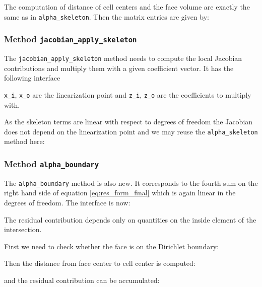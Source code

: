 \documentclass[a4paper,12pt]{article}
\begin{document}
The computation of distance of cell centers and the face volume are
exactly the same as in \lstinline{alpha_skeleton}.
Then the matrix entries are given by:


\subsubsection*{Method \lstinline{jacobian_apply_skeleton}}

The \lstinline{jacobian_apply_skeleton} method needs to
compute the local Jacobian contributions and multiply them with
a given coefficient vector. It has the following interface

\lstinline{x_i}, \lstinline{x_o} are the linearization point
and \lstinline{z_i}, \lstinline{z_o} are the coefficients to multiply with.

As the skeleton terms are linear with respect to degrees of freedom
the Jacobian does not depend on the linearization point and
we may reuse the \lstinline{alpha_skeleton} method here:


\subsubsection*{Method \lstinline{alpha_boundary}}

The \lstinline{alpha_boundary} method is also new. It corresponds
to the fourth sum on the right hand side of equation \eqref{eq:res_form_final}
which is again linear in the degrees of freedom.
The interface is now:

The residual contribution depends only on quantities on the inside
element of the intersection.

First we need to check whether the face is on the Dirichlet boundary:


Then the distance from face center to cell center is computed:

and the residual contribution can be accumulated:

\end{document}
